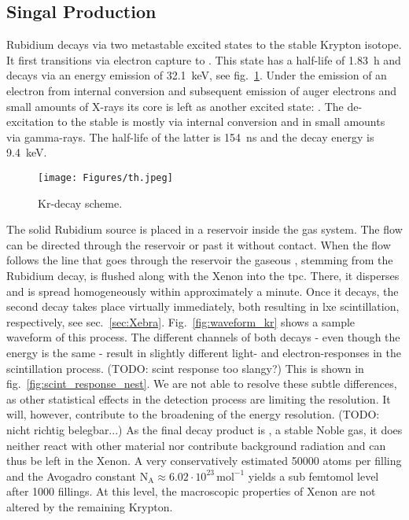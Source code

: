 
\FloatBarrier
\subsection{ Singal Production}
\label{ssec:source}
\FloatBarrier


Rubidium  decays via two metastable excited states to the stable  Krypton isotope.
It first transitions via electron capture to .
This state has a half-life of \SI{1.83}{\hour} and decays via an energy emission of \SI{32.1}{\kilo\electronvolt}, see fig.~\ref{fig:scheme_kr}.
Under the emission of an electron from internal conversion and subsequent emission of auger electrons and small amounts of X-rays its core is left as another excited state: .
The de-excitation to the stable  is mostly via internal conversion and in small amounts via gamma-rays.
The half-life of the latter is \SI{154}{\nano\s} and the decay energy is \SI{9.4}{\kilo\electronvolt}.


\begin{figure}
    \centering
    \texttt{[image: Figures/th.jpeg]}  %
    \caption[Decay Scheme Krypton]{
        Kr-decay scheme\cite{kr_scheme}.
    }
    \label{fig:scheme_kr}
\end{figure}

The solid Rubidium source is placed in a reservoir inside the gas system.
The flow can be directed through the reservoir or past it without contact.
When the flow follows the line that goes through the reservoir the gaseous , stemming from the Rubidium decay, is flushed along with the Xenon into the \gls{tpc}.
There, it disperses and is spread homogeneously within approximately a minute.
Once it decays, the second decay takes place virtually immediately, both resulting in \gls{lxe} scintillation, respectively, see sec.~\ref{sec:Xebra}.
Fig.~\ref{fig:waveform_kr} shows a sample waveform of this process.
The different channels of both decays - even though the energy is the same - result in slightly different light- and electron-responses in the scintillation process. (TODO: scint response too slangy?)
This is shown in fig.~\ref{fig:scint_response_nest}.
We are not able to resolve these subtle differences, as other statistical effects in the detection process are limiting the resolution.
It will, however, contribute to the broadening of the energy resolution. (TODO: nicht richtig belegbar...)
As the final decay product is , a stable Noble gas, it does neither react with other material nor contribute background radiation and can thus be left in the Xenon.
A very conservatively estimated \SI{50000}{} atoms per filling and the Avogadro constant $ \mathrm{N}_\mathrm{A} \approx 6.02\cdot10^{23}\,\mathrm{mol}^{-1} $ yields a sub femtomol level after 1000 fillings.
At this level, the macroscopic properties of Xenon are not altered by the remaining Krypton.


